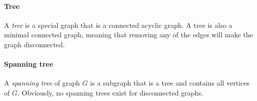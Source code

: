       \paragraph{Tree}

        A \emph{tree} is a special graph that is a connected acyclic graph. A tree is also a minimal connected graph, meaning that removing any of the edges will make the graph disconnected.


      \paragraph{Spanning tree}

        A \emph{spanning tree} of graph $G$ is a subgraph that is a tree and contains all vertices of $G$. Obviously, no spanning trees exist for disconnected graphs.
        
